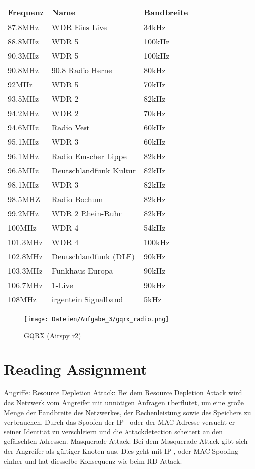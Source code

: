 \documentclass[12pt,a4paper]{article}
\begin{document}
\begin{table}[H]
\centering
\begin{tabular}{|l|l|l|}
\hline
Frequenz & Name & Bandbreite \\
\hline
87.8MHz & 	WDR Eins Live & 34kHz \\
\hline
88.8MHz & WDR 5 & 100kHz\\
\hline
90.3MHz & WDR 5 & 100kHz\\
\hline
90.8MHz & 90.8 Radio Herne & 80kHz \\
\hline
92MHz & WDR 5 & 70kHz\\
\hline
93.5MHz & WDR 2 & 82kHz \\
\hline
94.2MHz & WDR 2 & 70kHz\\
\hline 
94.6MHz & Radio Vest & 60kHz\\
\hline
95.1MHz & WDR 3 & 60kHz \\
\hline
96.1MHz & Radio Emscher Lippe & 82kHz\\
\hline
96.5MHz & Deutschlandfunk Kultur & 82kHz\\
\hline
98.1MHz & WDR 3 & 82kHz\\
\hline
98.5MHZ & Radio Bochum & 82kHz \\
\hline
99.2MHz & WDR 2 Rhein-Ruhr &82kHz\\
\hline
100MHz & WDR 4 & 54kHz \\
\hline
101.3MHz & WDR 4 & 100kHz \\
\hline
102.8MHz & Deutschlandfunk (DLF)&90kHz\\
\hline
103.3MHz & Funkhaus Europa & 90kHz\\
\hline
106.7MHz & 1-Live & 90kHz\\
\hline
108MHz & irgentein Signalband & 5kHz\\
\hline
\end{tabular}
\end{table}
\begin{figure}[H]
\centering
\texttt{[image: Dateien/Aufgabe\_3/gqrx\_radio.png]} 
\caption{GQRX (Airspy r2)}
\label{fig:3_4}
\end{figure}
\section{Reading Assignment}
Angriffe:
	Resource Depletion Attack: 
		Bei dem Resource Depletion Attack wird das Netzwerk vom Angreifer mit unnötigen Anfragen überflutet, um eine große Menge der Bandbreite des Netzwerkes, der Rechenleistung sowie des Speichers zu verbrauchen. Durch das Spoofen der IP-, oder der MAC-Adresse versucht er seiner Identität zu verschleiern und die Attackdetection scheitert an den gefälschten Adressen.
	Masquerade Attack:
		Bei dem Masquerade Attack gibt sich der Angreifer als gültiger Knoten aus. Dies geht mit IP-, oder MAC-Spoofing einher und hat diesselbe Konsequenz wie beim RD-Attack.
\end{document}
